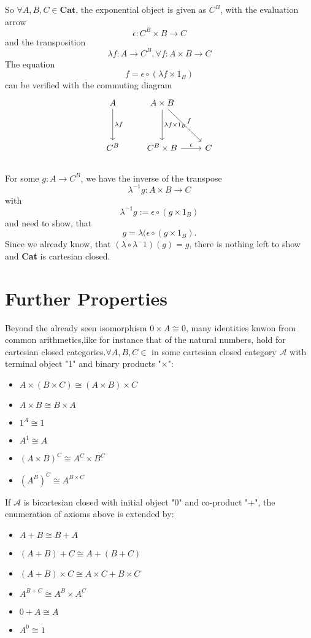   
  So $\forall A,B,C \in \textbf{Cat}$, the exponential object is given as $C^B$, with the evaluation arrow
  $$\epsilon: C^B \times B \to C $$ and the transposition
  $$\lambda f: A \to C^B,\forall f:A \times B \to C$$
  The equation
  $$f = \epsilon \circ (\lambda f \times 1_B)$$ can be verified with the commuting diagram
  \[
  \begin{tikzcd}[row sep=huge]
    A \arrow{d}{\lambda f} & A \times B \arrow{d}{\lambda f \times 1_B} \arrow{dr}{f} \\
    C^B                    & C^B \times B \arrow{r}{\epsilon} & C 
  \end{tikzcd}
  \]
  \\
  For some $g:A \to C^B$, we have the inverse of the transpose
  $$\lambda^{-1}g: A\times B \to C$$ with
  $$\lambda^{-1}g:=\epsilon \circ (g\times 1_B)$$
  and need to show, that
  $$g = \lambda(\epsilon \circ (g\times 1_B).$$
  Since we already know, that $(\lambda \circ \lambda^-1) (g) = g$, there is nothing left to show and \textbf{Cat} is cartesian closed. 
 
\section{Further Properties}

Beyond the already seen isomorphism $0 \times A \cong 0$, many identities knwon from common arithmetics,like for instance that of the natural numbers,
hold for cartesian closed categories.$\forall A, B, C \in $ in some cartesian closed category $\mathcal{A}$ with terminal object "1" and binary products "$\times$": 
\begin{itemize}
\item $A \times (B \times C) \cong (A \times B) \times C$
\item $A \times B \cong B \times A$
\item $ 1^A \cong 1 $
\item $ A^1 \cong A$
\item $(A \times B)^C \cong A^C \times B^C$
\item $(A^B)^C \cong A^{B \times C} $
\end{itemize}

If $\mathcal{A}$ is bicartesian closed with initial object "0" and co-product "+", the enumeration of axioms above is extended by: 
\begin{itemize}
\item $A+B \cong B+A$
\item $(A+B)+C \cong A+(B+C)$
\item $(A+B)\times C \cong A \times C+B \times C$
\item $A^{B+C} \cong A^B \times A^C $
\item $0+A \cong A$
\item $A^0 \cong 1$
\end{itemize}

